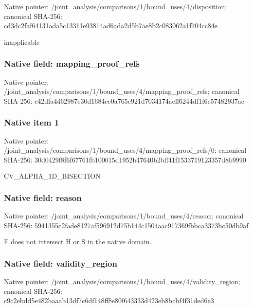 \documentclass[10pt,a4paper]{article}
\begin{document}
Native pointer: /joint\_analysis/comparis\allowbreak{}ons/1/bound\_uses/4/dispo\allowbreak{}sition; canonical SHA-256: cd3dc2faf64131ada5c13311\allowbreak{}e93814ad6ada2d5b7ae8b2c0\allowbreak{}83062a1f704cc84e


inapplicable


\subsubsection{Native field: mapping\_proof\_refs}


Native pointer: /joint\_analysis/comparis\allowbreak{}ons/1/bound\_uses/4/mappi\allowbreak{}ng\_proof\_refs; canonical SHA-256: c42dfa4462987e30d1684ee0\allowbreak{}a765e921d7034174aeff6244\allowbreak{}df1f6c57482937ac



\subsubsection{Native item 1}


Native pointer: /joint\_analysis/comparis\allowbreak{}ons/1/bound\_uses/4/mappi\allowbreak{}ng\_proof\_refs/0; canonical SHA-256: 30d0429f8f6f67761fb10001\allowbreak{}5d1952b47640b2bff41f1533\allowbreak{}719123357d8b9990


CV\_ALPHA\_1D\_BISECTION


\subsubsection{Native field: reason}


Native pointer: /joint\_analysis/comparis\allowbreak{}ons/1/bound\_uses/4/reaso\allowbreak{}n; canonical SHA-256: 5941355c2fade8127af59691\allowbreak{}2d75b144c1504aac917369fb\allowbreak{}bca3373bc50db9af


E does not intersect H or S in the native domain.


\subsubsection{Native field: validity\_region}


Native pointer: /joint\_analysis/comparis\allowbreak{}ons/1/bound\_uses/4/valid\allowbreak{}ity\_region; canonical SHA-256: c9c2ebdd5e482baaab13df7c\allowbreak{}6df148ff8e80f643333d423e\allowbreak{}b8bcbf4f31ded6e3
\end{document}
